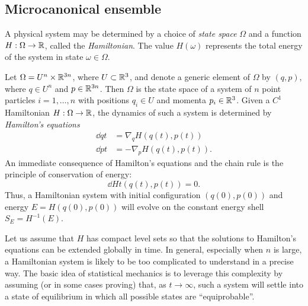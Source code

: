 
\subsection{Microcanonical ensemble}

A physical system may be determined by a choice of \emph{state space} $\Omega$ and a function
$H : \Omega \rightarrow {\mathbb R}$, called the \emph{Hamiltonian}. The value $H(\omega)$ represents the
total energy of the system in state $\omega\in\Omega$.

\begin{example}
Let $\Omega = U^n \times {\mathbb R}^{3n}$, where $U \subset {\mathbb R}^3$, and denote a generic element of
$\Omega$ by $(q, p)$, where $q \in U^n$ and $p \in {\mathbb R}^{3n}$. Then $\Omega$ is the state
space of a system of $n$ point particles $i = 1, \ldots, n$ with positions $q_i \in U$
and momenta $p_i \in {\mathbb R}^3$. Given a $C^1$ Hamiltonian $H : \Omega \rightarrow {\mathbb R}$,
the dynamics of such a system is determined by \emph{Hamilton's equations}
\begin{align}
\dd{q}{t} &= \nabla_q H(q(t), p(t)) \\
\dd{p}{t} &= -\nabla_p H(q(t), p(t)).
\end{align}
An immediate consequence of Hamilton's equations and the chain rule is the principle
of conservation of energy:
\begin{equation}
\dd{H}{t}(q(t), p(t)) = 0.
\end{equation}
Thus, a Hamiltonian system with initial configuration $(q(0), p(0))$ and energy
$E = H(q(0), p(0))$ will evolve on the constant energy shell $S_E = H^{-1}(E)$.

Let us assume that $H$ has compact level sets so that the solutions to Hamilton's
equations can be extended globally in time. In general, especially when $n$ is large,
a Hamiltonian system is likely to be too complicated to understand in a precise way.
The basic idea of statistical mechanics is to leverage this complexity by assuming
(or in some cases proving) that, as $t\to\infty$, such a system will settle into a
state of equilibrium in which all possible states are ``equiprobable''.
\end{example}

